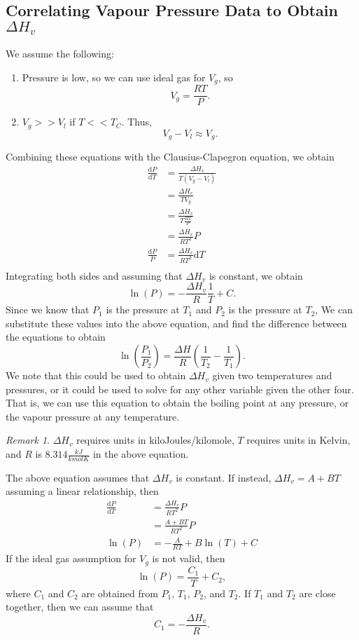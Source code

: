 \documentclass[11pt]{article}
\theoremstyle{plain} %
\theoremstyle{definition}
\theoremstyle{example}
\theoremstyle{remark}
\newtheorem*{remark}{Remark}
\begin{document}
\subsection{Correlating Vapour Pressure Data to Obtain $\Delta H_v$}
We assume the following:
\begin{enumerate}
	\item Pressure is low, so we can use ideal gas for $V_g$, so 
	$$V_g = \frac{RT}{P}.$$
	\item $V_g >> V_l$ if $T << T_C$. Thus, 
	$$V_g-V_l \approx V_g.$$
\end{enumerate}
Combining these equations with the Clausius-Clapegron equation, we obtain 
\begin{align*}
	\frac{\mathrm d P}{\mathrm d T} & = \frac{\Delta H_v}{T(V_g-V_l)}\\
	&= \frac{\Delta H_v}{TV_g}\\
	&= \frac{\Delta H_v}{T\frac{RT}{P}}\\
	&= \frac{\Delta H_v}{RT^2}P\\
	\frac{\mathrm d P}{P} &= \frac{\Delta H_v}{RT^2}\mathrm d T\\
\end{align*}
Integrating both sides and assuming that $\Delta H_v$ is constant, we obtain 
$$\ln(P) = -\frac{\Delta H_v}{R}\frac{1}{T} + C.$$
Since we know that $P_1$ is the pressure at $T_1$ and $P_2$ is the pressure at $T_2$, We can substitute these values into the above equation, and find the difference between the equations to obtain 
$$\ln\left(\frac{P_1}{P_2}\right) = \frac{\Delta H}{R}\left(\frac{1}{T_2} - \frac{1}{T_1}\right).$$
We note that this could be used to obtain $\Delta H_v$ given two temperatures and pressures, or it could be used to solve for any other variable given the other four. That is, we can use this equation to obtain the boiling point at any pressure, or the vapour pressure at any temperature.
\begin{remark}
	$\Delta H_v$ requires units in kiloJoules/kilomole, $T$ requires units in Kelvin, and $R$ is $8.314\frac{kJ}{kmolK}$ in the above equation.
	
	The above equation assumes that $\Delta H_v$ is constant. If instead, $\Delta H_v = A + BT$ assuming a linear relationship, then 
\begin{align*}
	\frac{\mathrm d P}{\mathrm d T} &= \frac{\Delta H_v}{RT^2}P\\
	&= \frac{A+BT}{RT^2}P\\
	\ln(P) &= -\frac{A}{RT}+B\ln(T)+C
\end{align*}
If the ideal gas assumption for $V_g$ is not valid, then 
$$\ln(P) = \frac{C_1}{T} + C_2,$$
where $C_1$ and $C_2$ are obtained from $P_1$, $T_1$, $P_2$, and $T_2$. If $T_1$ and $T_2$ are close together, then we can assume that 
$$C_1 = -\frac{\Delta H_v}{R}.$$
\end{remark}
\end{document}
